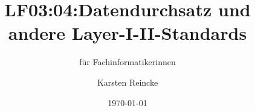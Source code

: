 \documentclass[]{beamer}
\title{LF03:04:Datendurchsatz und andere Layer-I-II-Standards}
\subtitle{für Fachinformatikerinnen}
\institute{GS-LDK}
\author{Karsten Reincke}
\date{\today}
\def\cfgGl{../../../cfg.gl/}
\begin{document}

\begin{frame}
  \titlepage
\end{frame}






\logo{}
\newpage



%
\end{document}
